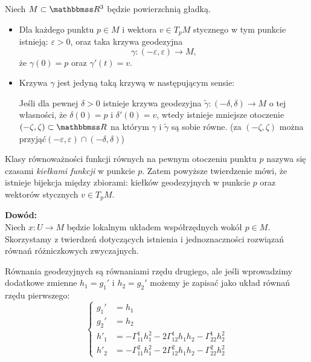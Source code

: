 \begin{frame}

\begin{twierdzenie}
Niech $M\subset \R^3$ będzie powierzchnią gładką.
\begin{itemize}
\item Dla każdego punktu $p\in M$ i wektora $v\in T_pM$ stycznego w tym punkcie istnieją: $\varepsilon>0$, oraz taka krzywa geodezyjna \[\gamma\colon(-\varepsilon,\varepsilon)\to M,\]że $\gamma(0)=p$ oraz $\gamma'(t)=v$. 
\pause \item Krzywa $\gamma$ jest jedyną taką krzywą w następującym sensie:

Jeśli dla pewnej $\delta>0$ istnieje krzywa geodezyjna $\widetilde{{\gamma}}\colon (-\delta,\delta)\to M$ o tej własności, że $\delta(0)=p$ i $\delta'(0)=v$, wtedy istnieje mniejsze otoczenie $(-\zeta,\zeta)\subset \R$ na którym $\gamma$ i $\widetilde{\gamma}$ są sobie równe. 
\pause (za $(-\zeta,\zeta)$ można przyjąć$(-\varepsilon,\varepsilon)\cap(-\delta,\delta)$)
\end{itemize}
\end{twierdzenie}

\end{frame}
\begin{frame}


\begin{uwaga}
Klasy równoważności funkcji równych na pewnym otoczeniu punktu $p$ nazywa się 
czasami \textit{kiełkami funkcji} w punkcie $p$. Zatem powyższe 
twierdzenie mówi, że istnieje bijekcja między zbiorami: kiełków geodezyjnych w 
punkcie $p$ oraz wektorów stycznych $v\in T_pM$.
\end{uwaga}

\pause \textcolor{ared}{\textbf{Dowód:}}\\
Niech $x\colon U\to M$ będzie lokalnym układem współrzędnych wokół $p\in M$.
Skorzystamy z twierdzeń dotyczących istnienia i jednoznaczności rozwiązań równań różniczkowych zwyczajnych. 

\end{frame}
\begin{frame}

Równania geodezyjnych są równaniami rzędu drugiego, ale jeśli wprowadzimy dodatkowe zmienne $h_1=g_1'$ i $h_2=g_2'$ możemy je zapisać jako układ równań rzędu pierwszego:
\pause \begin{equation}\label{eqn:uniq-geodes}
\left\{
\begin{aligned}
g_1'&=h_1\\
g_2'&=h_2\\
h'_1&=-\Gamma^1_{11}h_1^2-2\Gamma^1_{12}h_1h_2-\Gamma^1_{22}h_2^2\\
h'_2&=-\Gamma^2_{11}h_1^2-2\Gamma^2_{12}h_1h_2-\Gamma^2_{22}h_2^2
\end{aligned}
\right.
\end{equation}


\end{frame}
